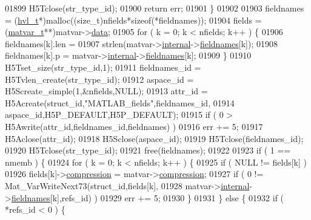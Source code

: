 \begin{DoxyCode}
{{{{01899                 H5Tclose(str\_type\_id);
01900                 \textcolor{keywordflow}{return} err;
01901             \}
01902 
01903             fieldnames = (\hyperlink{structhvl__t}{hvl\_t}*)malloc((\textcolor{keywordtype}{size\_t})nfields*\textcolor{keyword}{sizeof}(*fieldnames));
01904             fields     = (\hyperlink{group___m_a_t_structmatvar__t}{matvar\_t}**)matvar->\hyperlink{group___m_a_t_a5672978efa230bbdecdf38ede781f7fa}{data};
01905             for ( k = 0; k < nfields; k++ ) \{
01906                 fieldnames[k].len =
01907                 strlen(matvar->\hyperlink{group___m_a_t_a6e97e3ed9f40c49322c18561c2a94e92}{internal}->\hyperlink{structmatvar__internal_a7574d000bfc98ad4860ae6590b8d4985}{fieldnames}[k]);
01908                 fieldnames[k].p   = matvar->\hyperlink{group___m_a_t_a6e97e3ed9f40c49322c18561c2a94e92}{internal}->\hyperlink{structmatvar__internal_a7574d000bfc98ad4860ae6590b8d4985}{fieldnames}[k];
01909             \}
01910             H5Tset\_size(str\_type\_id,1);
01911             fieldnames\_id = H5Tvlen\_create(str\_type\_id);
01912             aspace\_id     = H5Screate\_simple(1,&nfields,NULL);
01913             attr\_id = H5Acreate(struct\_id,\textcolor{stringliteral}{"MATLAB\_fields"},fieldnames\_id,
01914                                 aspace\_id,H5P\_DEFAULT,H5P\_DEFAULT);
01915             \textcolor{keywordflow}{if} ( 0 > H5Awrite(attr\_id,fieldnames\_id,fieldnames) )
01916                 err += 5;
01917             H5Aclose(attr\_id);
01918             H5Sclose(aspace\_id);
01919             H5Tclose(fieldnames\_id);
01920             H5Tclose(str\_type\_id);
01921             free(fieldnames);
01922 
01923             \textcolor{keywordflow}{if} ( 1 == nmemb ) \{
01924                 \textcolor{keywordflow}{for} ( k = 0; k < nfields; k++ ) \{
01925                     \textcolor{keywordflow}{if} ( NULL != fields[k] )
01926                         fields[k]->\hyperlink{group___m_a_t_aeef0466048621cb2c959ba7f6c774d06}{compression} = matvar->\hyperlink{group___m_a_t_aeef0466048621cb2c959ba7f6c774d06}{compression};
01927                     \textcolor{keywordflow}{if} ( 0 != Mat\_VarWriteNext73(struct\_id,fields[k],
01928                         matvar->\hyperlink{group___m_a_t_a6e97e3ed9f40c49322c18561c2a94e92}{internal}->\hyperlink{structmatvar__internal_a7574d000bfc98ad4860ae6590b8d4985}{fieldnames}[k],refs\_id) )
01929                         err += 5;
01930                 \}
01931             \} \textcolor{keywordflow}{else} \{
01932                 \textcolor{keywordflow}{if} ( *refs\_id < 0 ) \{
}}}}
\end{DoxyCode}
